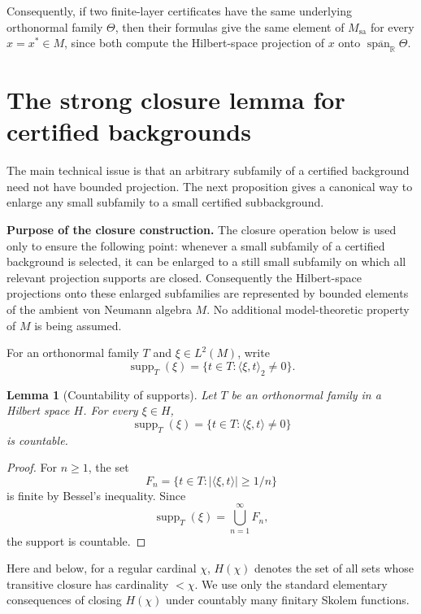 \documentclass[11pt,letterpaper,reqno]{amsart}
\newtheorem{lem}[thm]{Lemma}
\theoremstyle{definition}
\numberwithin{equation}{section}
\newcommand{\sa}{\mathrm{sa}}
\newcommand{\RR}{\mathbb R}
\DeclareMathOperator{\spanop}{span}
\DeclareMathOperator{\supp}{supp}
\begin{document}
Consequently, if two finite-layer certificates have the same underlying
orthonormal family \(\Theta\), then their formulas give the same element of
\(M_{\sa}\) for every \(x=x^*\in M\), since both compute the Hilbert-space
projection of \(x\) onto \(\overline{\spanop_{\RR}}\Theta\).


\section{The strong closure lemma for certified backgrounds}\label{sec:strong-closure}

The main technical issue is that an arbitrary subfamily of a certified background need not have bounded projection.  The next proposition gives a canonical way to enlarge any small subfamily to a small certified subbackground.



\medskip
\noindent\textbf{Purpose of the closure construction.}
The closure operation below is used only to ensure the following point: whenever
a small subfamily of a certified background is selected, it can be enlarged to
a still small subfamily on which all relevant projection supports are closed.
Consequently the Hilbert-space projections onto these enlarged subfamilies are
represented by bounded elements of the ambient von Neumann algebra \(M\).  No
additional model-theoretic property of \(M\) is being assumed.



For an orthonormal family $T$ and $\xi\in L^2(M)$, write
\[
   \supp_T(\xi)=\{t\in T:\langle \xi,t\rangle_2\neq0\}.
\]

\begin{lem}[Countability of supports]\label{lem:countable-supports}
Let $T$ be an orthonormal family in a Hilbert space $H$.  For every
$\xi\in H$,
\[
   \supp_T(\xi)=\{t\in T:\langle \xi,t\rangle\neq0\}
\]
is countable.
\end{lem}

\begin{proof}
For $n\geq1$, the set
\[
   F_n=\{t\in T:|\langle \xi,t\rangle|\geq 1/n\}
\]
is finite by Bessel's inequality.  Since
\[
   \supp_T(\xi)=\bigcup_{n=1}^\infty F_n,
\]
the support is countable.
\end{proof}


Here and below, for a regular cardinal \(\chi\), \(H(\chi)\) denotes the set
of all sets whose transitive closure has cardinality \(<\chi\).  We use only
the standard elementary consequences of closing \(H(\chi)\) under countably
many finitary Skolem functions.
\end{document}
